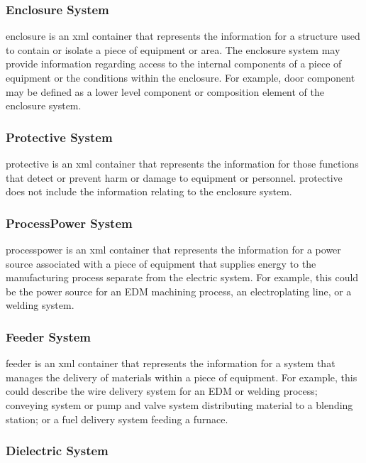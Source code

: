\subsubsection{Enclosure System}

\gls{enclosure} is an \gls{xml} container that represents the information for a structure used to contain or isolate a piece of equipment or area.  The \gls{enclosure} system may provide information regarding access to the internal components of a piece of equipment or the conditions within the enclosure.   For example, \gls{door component} may be defined as a \gls{lower level} \gls{component} or \gls{composition} element of the \gls{enclosure} system.

\subsubsection{Protective System}

\gls{protective} is an \gls{xml} container that represents the information for those functions that detect or prevent harm or damage to equipment or personnel.  \gls{protective} does not include the information relating to the \gls{enclosure} system.

\subsubsection{ProcessPower System}

\gls{processpower} is an \gls{xml} container that represents the information for a power source associated with a piece of equipment that supplies energy to the manufacturing process separate from the \gls{electric} system.  For example, this could be the power source for an EDM machining process, an electroplating line, or a welding system.  

\subsubsection{Feeder System}

\gls{feeder} is an \gls{xml} container that represents the information for a system that manages the delivery of materials within a piece of equipment.   For example, this could describe the wire delivery system for an EDM or welding process; conveying system or pump and valve system distributing material to a blending station; or a fuel delivery system feeding a furnace.  

\subsubsection{Dielectric System}

